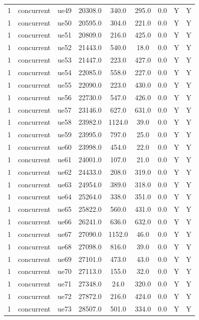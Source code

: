 \begin{table}[ht]
\begin{tabular}{|c|c|c|c|c|c|c|c|c|}
1 & concurrent & ue49 & 20308.0 & 340.0 & 295.0 & 0.0 & Y & Y \\
1 & concurrent & ue50 & 20595.0 & 304.0 & 221.0 & 0.0 & Y & Y \\
1 & concurrent & ue51 & 20809.0 & 216.0 & 425.0 & 0.0 & Y & Y \\
1 & concurrent & ue52 & 21443.0 & 540.0 & 18.0 & 0.0 & Y & Y \\
1 & concurrent & ue53 & 21447.0 & 223.0 & 427.0 & 0.0 & Y & Y \\
1 & concurrent & ue54 & 22085.0 & 558.0 & 227.0 & 0.0 & Y & Y \\
1 & concurrent & ue55 & 22090.0 & 223.0 & 430.0 & 0.0 & Y & Y \\
1 & concurrent & ue56 & 22730.0 & 547.0 & 426.0 & 0.0 & Y & Y \\
1 & concurrent & ue57 & 23146.0 & 627.0 & 631.0 & 0.0 & Y & Y \\
1 & concurrent & ue58 & 23982.0 & 1124.0 & 39.0 & 0.0 & Y & Y \\
1 & concurrent & ue59 & 23995.0 & 797.0 & 25.0 & 0.0 & Y & Y \\
1 & concurrent & ue60 & 23998.0 & 454.0 & 22.0 & 0.0 & Y & Y \\
1 & concurrent & ue61 & 24001.0 & 107.0 & 21.0 & 0.0 & Y & Y \\
1 & concurrent & ue62 & 24433.0 & 208.0 & 319.0 & 0.0 & Y & Y \\
1 & concurrent & ue63 & 24954.0 & 389.0 & 318.0 & 0.0 & Y & Y \\
1 & concurrent & ue64 & 25264.0 & 338.0 & 351.0 & 0.0 & Y & Y \\
1 & concurrent & ue65 & 25822.0 & 560.0 & 431.0 & 0.0 & Y & Y \\
1 & concurrent & ue66 & 26241.0 & 636.0 & 632.0 & 0.0 & Y & Y \\
1 & concurrent & ue67 & 27090.0 & 1152.0 & 46.0 & 0.0 & Y & Y \\
1 & concurrent & ue68 & 27098.0 & 816.0 & 39.0 & 0.0 & Y & Y \\
1 & concurrent & ue69 & 27101.0 & 473.0 & 43.0 & 0.0 & Y & Y \\
1 & concurrent & ue70 & 27113.0 & 155.0 & 32.0 & 0.0 & Y & Y \\
1 & concurrent & ue71 & 27348.0 & 24.0 & 320.0 & 0.0 & Y & Y \\
1 & concurrent & ue72 & 27872.0 & 216.0 & 424.0 & 0.0 & Y & Y \\
1 & concurrent & ue73 & 28507.0 & 501.0 & 334.0 & 0.0 & Y & Y \\

\end{tabular}
\end{table}
